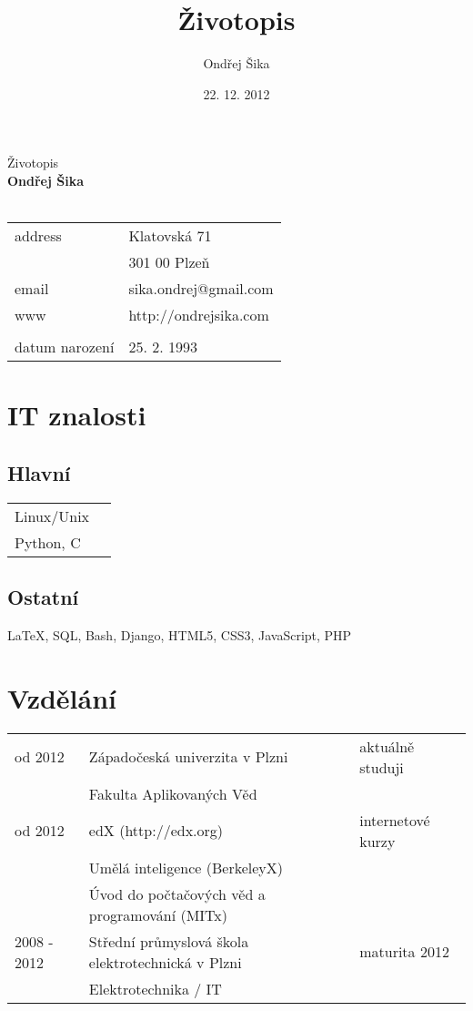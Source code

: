 \documentclass[12pt,a4paper]{article}
\title{Životopis}
\author{Ondřej Šika}
\date{22. 12. 2012}
\begin{document}
\begin{center}
{\Large Životopis}\\
\vspace*{1cm}
{\LARGE \bf Ondřej Šika}\\
\hrulefill\\
\vspace*{0.2cm}
\begin{tabular}{l l}
address & Klatovská 71\\
 & 301 00 Plzeň\\
email & sika.ondrej@gmail.com\\
www & http://ondrejsika.com\\
\\
datum narození & 25. 2. 1993\\
\end{tabular}
\end{center}

\section*{IT znalosti}
\subsection*{Hlavní}
\begin{tabular}{@{}ll}
Linux/Unix & \\
Python, C & \\
\end{tabular}

\subsection*{Ostatní}
LaTeX, SQL, Bash, Django, HTML5, CSS3, JavaScript, PHP

\section*{Vzdělání}
\begin{tabular}{@{}p{2cm}ll}
od 2012  & Západočeská univerzita v Plzni & aktuálně studuji\\
 & Fakulta Aplikovaných Věd & \\
od 2012  & edX (http://edx.org) & internetové kurzy\\
 & Umělá inteligence (BerkeleyX) & \\
 & Úvod do počtačových věd a programování (MITx) & \\
2008 - 2012 & Střední průmyslová škola elektrotechnická v Plzni & maturita 2012\\
 & Elektrotechnika / IT & \\
\end{tabular}
\end{document}
